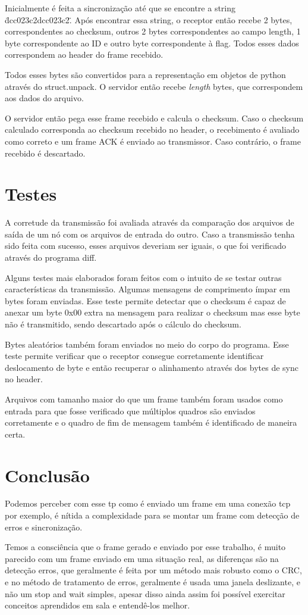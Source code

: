 \documentclass[a4paper,10pt]{article}
\begin{document}
  Inicialmente é feita a sincronização até que se encontre a string
  \"dcc023c2dcc023c2\". Após encontrar essa string, o receptor então recebe
  2 bytes, correspondentes ao checksum, outros 2 bytes correspondentes ao
  campo length, 1 byte correspondente ao ID e outro byte correspondente à
  flag. Todos esses dados correspondem ao header do frame recebido.

  Todos esses bytes são convertidos para a representação em objetos de python
  através do struct.unpack. O servidor então recebe \textit{length} bytes,
  que correspondem aos dados do arquivo.

  O servidor então pega esse frame recebido e calcula o checksum.
  Caso o checksum calculado corresponda ao checksum recebido no header, o
  recebimento é avaliado como correto e um frame ACK é enviado ao transmissor.
  Caso contrário, o frame recebido é descartado.

\section{Testes}
  A corretude da transmissão foi avaliada através da comparação dos arquivos
  de saída de um nó com os arquivos de entrada do outro. Caso a transmissão
  tenha sido feita com sucesso, esses arquivos deveriam ser iguais, o que foi
  verificado através do programa diff.

  Alguns testes mais elaborados foram feitos com o intuito de se testar outras
  características da transmissão. Algumas mensagens de comprimento ímpar em
  bytes foram enviadas. Esse teste permite detectar que o checksum é capaz
  de anexar um byte 0x00 extra na mensagem para realizar o checksum mas
  esse byte não é transmitido, sendo descartado após o cálculo do checksum.

  Bytes aleatórios também foram enviados no meio do corpo do programa.
  Esse teste permite verificar que o receptor consegue corretamente
  identificar deslocamento de byte e então recuperar o alinhamento através
  dos bytes de sync no header.

  Arquivos com tamanho maior do que um frame também foram usados como entrada
  para que fosse verificado que múltiplos quadros são enviados corretamente
  e o quadro de fim de mensagem também é identificado de maneira certa.


\section{Conclusão}
  Podemos perceber com esse tp como é enviado um frame em uma conexão
  tcp por exemplo, é nítida a complexidade para se montar um frame com
  detecção de erros e sincronização.

  Temos a consciência que o frame gerado e enviado por esse trabalho, é muito
  parecido  com um frame enviado em uma situação real, as diferenças são
  na detecção erros, que geralmente é feita por um método mais robusto
  como o CRC, e no método de tratamento de erros, geralmente é usada uma
  janela deslizante, e não um stop and wait simples, apesar disso ainda assim
  foi possível exercitar conceitos aprendidos em sala e entendê-los melhor.
\end{document}
